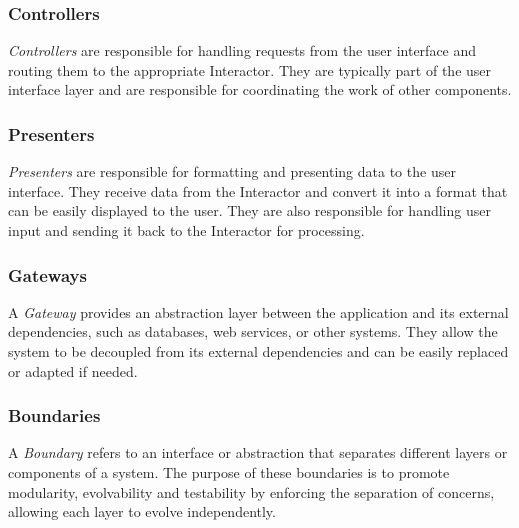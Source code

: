 \subsubsection{Controllers}
\textit{Controllers} are responsible for handling requests from the user interface and
routing them to the appropriate Interactor. They are typically part of the user interface
layer and are responsible for coordinating the work of other components.

\subsubsection{Presenters}
\textit{Presenters} are responsible for formatting and presenting data to the user
interface. They receive data from the Interactor and convert it into a format that can be
easily displayed to the user. They are also responsible for handling user input and
sending it back to the Interactor for processing.

\subsubsection{Gateways}
A \textit{Gateway} provides an abstraction layer between the application and its external
dependencies, such as databases, web services, or other systems. They allow the
system to be decoupled from its external dependencies and can be easily replaced or
adapted if needed.

\subsubsection{Boundaries}
A \textit{Boundary} refers to an interface or abstraction that separates different layers
or components of a system. The purpose of these boundaries is to promote modularity,
evolvability and testability by enforcing the separation of concerns, allowing each layer
to evolve independently.